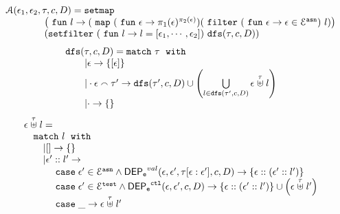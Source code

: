 \begin{defn}
\[
\begin{array}{l}
	\mathcal{A}(\event_1, \event_2, \trace, c, D)
	= 
	\kw{setmap} ~
	\\ \qquad \qquad
	\left(\efun l \to ( \emap 
		(\efun  \event \to \pi_1(\event)^{\pi_2(\event)})
	(\efilter 
		(\efun \event \to  \event \in \eventset^{\asn}) ~ l) \right)
	\\ \qquad \qquad
	(\kw{setfilter} ~
		(\efun l \to l = [\event_1, \cdots, \event_2]) ~ \kw{dfs}(\trace, c, D))
	\end{array}
\]
%
%
\[
\begin{array}{l}
	\kw{dfs}(\trace, c, D)
	= 
	\ematch~  \trace ~ \ewith
	\\ \qquad
	| \event \to \{[\event]\}
	\\ \qquad
	|  \cdot \event \tracecat \trace' \to  
	\kw{dfs}(\trace', c, D)
	\cup 
	\left(   \bigcup\limits_{l \in \kw{dfs}(\trace', c, D) }
	\event \stackrel{\trace}{\uplus} l 
	\right)
	\\ \qquad
	| \cdot \to \{\}
\end{array}
\]
%
%
\[
\begin{array}{l}
	\event \stackrel{\trace}{\uplus} l
	= 
	\\ \quad
	\ematch~  l ~ \ewith
	\\ \qquad
	| [] \to \{\}
	\\ \qquad
	|  \event' :: l' \to  
	\\ \quad \qquad 	
	\ecase \event' \in \eventset^{\asn}  \land \eventdep^{val}(\event, \event', \trace[\event:\event'], c, D)
	\to \left\{ \event::(\event' :: l') \right\}
	\\ \quad \qquad 	
	\ecase \event' \in \eventset^{\test} \land \eventdep^{\ctl}(\event, \event', c, D)
	\to \left\{ \event::(\event' :: l') \right\}\cup \left( \event \stackrel{\trace}{\uplus} l' \right)
	\\ \quad \qquad 	
	\ecase \_ \to \event \stackrel{\trace}{\uplus} l' 
\end{array}
\]
\end{defn}

